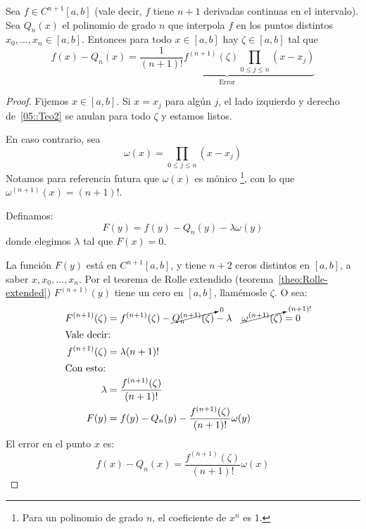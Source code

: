   \begin{theorem}
    \label{theo:interpolation-error}
    Sea \(f \in C^{n+1}[a, b]\)
    (vale decir,
     \(f\) tiene \(n + 1\) derivadas continuas en el intervalo).
    Sea \(Q_n(x)\) el polinomio de grado \(n\)
    que interpola \(f\)
    en los puntos distintos \(x_0, \dotsc, x_n \in[a, b]\).
    Entonces para todo \(x \in [a, b]\)
    hay \(\zeta \in [a, b]\) tal que
    \begin{equation}
      \label{05::Teo2}
      f(x) - Q_n(x)
        = \underbrace{\frac{1}{(n + 1)!} f^{(n+1)}(\zeta)
              \prod_{0 \le j \le n}(x - x_j)}_{\text{Error}}
    \end{equation}
  \end{theorem}
  \begin{proof}
    Fijemos \(x \in [a, b]\).
    Si \(x = x_j\) para algún \(j\),
    el lado izquierdo y derecho de~\eqref{05::Teo2} se anulan
    para todo \(\zeta\)
    y estamos listos.

    En caso contrario,
    sea
    \begin{equation}
      \omega(x)
        = \prod_{0\leq j\leq n}(x-x_j)
    \end{equation}
    Notamos para referencia futura
    que \(\omega(x)\) es mónico%
      \footnote{Para un polinomio de grado \(n\),
                el coeficiente de \(x^n\) es \num{1}.},
    con lo que \(\omega^{(n+1)}(x) = (n + 1)!\).

    Definamos:
    \begin{equation}
      F(y)
        = f(y)-Q_n(y) - \lambda \omega(y)
    \end{equation}
    donde elegimos \(\lambda\) tal que \(F(x) = 0\).

    La función \(F(y)\) está en \(C^{n+1}[a, b]\),
    y tiene \(n + 2\) ceros distintos en \([a, b]\),
    a saber \(x, x_0, \dotsc, x_n\).
    Por el teorema de Rolle extendido
    (teorema~\ref{theo:Rolle-extended})
    \(F^{(n + 1)}(y)\) tiene un cero en \([a, b]\),
    llamémosle \(\zeta\).
    O sea:
    \begin{align*}
      F^{(n + 1)}(\zeta)
        &= f^{(n + 1)}(\zeta)
             - \cancelto{\scriptstyle 0}{Q_n^{(n + 1)}(\zeta)}
             - \lambda
          \quad \cancelto{\scriptstyle(n + 1)!}{\omega^{(n + 1)}(\zeta)}
         = 0 \\
    \intertext{Vale decir:}
      f^{(n + 1)}(\zeta)
        &= \lambda(n + 1)! \\
    \intertext{Con esto:}
      \lambda
        &= \frac{f^{(n + 1)}(\zeta)}{(n + 1)!} \\
      F(y)
        &= f(y) - Q_n(y) - \frac{f^{(n + 1)}(\zeta)}{(n + 1)!} \omega(y)
    \end{align*}
    El error en el punto \(x\) es:
    \begin{equation*}
      f(x) - Q_n(x)
        = \frac{f^{(n + 1)}(\zeta)}{(n + 1)!} \omega(x)
    \end{equation*}
  \end{proof}
